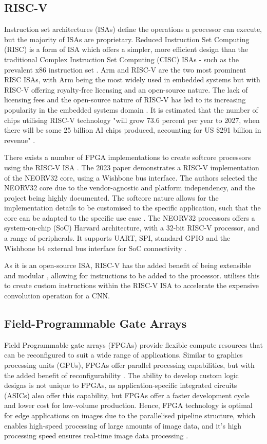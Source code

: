 \subsection{RISC-V}
Instruction set architectures (ISAs) define the operations a processor can execute, but the majority of ISAs are proprietary. 
Reduced Instruction Set Computing (RISC) is a form of ISA which offers a simpler, more efficient design than the traditional Complex Instruction Set Computing (CISC) ISAs - such as the prevalent x86 instruction set \cite{Arm}.
Arm and RISC-V are the two most prominent RISC ISAs, with Arm being the most widely used in embedded systems but with RISC-V offering royalty-free licensing and an open-source nature.
The lack of licensing fees and the open-source nature of RISC-V has led to its increasing popularity in the embedded systems domain \cite{Neutron}.
It is estimated that the number of chips utilising RISC-V technology "will grow 73.6 percent per year to 2027, when there will be some 25 billion AI chips produced, accounting for US \$291 billion in revenue" \cite{Drowsiness}.

There exists a number of FPGA implementations to create softcore processors using the RISC-V ISA \cite{RISCFPGA}. 
The 2023 paper \cite{Neutron} demonstrates a RISC-V implementation of the NEORV32 core, using a Wishbone bus interface. 
The authors selected the NEORV32 core due to the vendor-agnostic and platform independency, and the project being highly documented.
The softcore nature allows for the implementation details to be customised to the specific application, such that the core can be adapted to the specific use case \cite{DCT}. The NEORV32 processors offers a system-on-chip (SoC) Harvard architecture, with a 32-bit RISC-V processor, and a range of peripherals.
It supports UART, SPI, standard GPIO and the Wishbone b4 external bus interface for SoC connectivity \cite{NEORV32}.

As it is an open-source ISA, RISC-V has the added benefit of being extensible and modular \cite{Cryptography}, allowing for instructions to be added to the processor.
\cite{Reconfigurable} utilises this to create custom instructions within the RISC-V ISA to accelerate the expensive convolution operation for a CNN.

\subsection{Field-Programmable Gate Arrays}
Field Programmable gate arrays (FPGAs) provide flexible compute resources that can be reconfigured to suit a wide range of applications.
Similar to graphics processing units (GPUs), FPGAs offer parallel processing capabilities, but with the added benefit of reconfigurability \cite{Parallelism}.
The ability to develop custom logic designs is not unique to FPGAs, as application-specific integrated circuits (ASICs) also offer this capability, but FPGAs offer a faster development cycle and lower cost for low-volume production.
Hence, FPGA technology is optimal for edge applications on images due to the parallelised pipeline structure, which enables high-speed processing of large amounts of image data, and it's high processing speed ensures real-time image data processing \cite{Video}.


